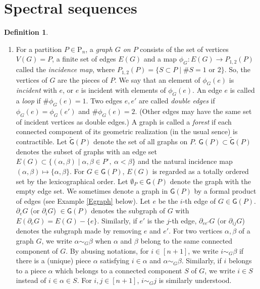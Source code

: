 \documentclass[reqno]{amsart}
\theoremstyle{definition}
\newtheorem{defi}{Definition}[section]
\theoremstyle{plain}
\newcommand{\GG}{\mathsf{G}}%
\newcommand{\TGG}{\tilde{\mathsf{G}}}%
\newcommand{\PP}{\mathrm{P}} %
\begin{document}
\section{Spectral sequences}\label{Sspec_seq}
\begin{defi}\label{Dgraph}
\begin{enumerate}
\item  For a partition $P\in \PP_n$, a {\em graph $G$ on   $P$} consists of the set of vertices $V(G)=P$, a finite set of edges $E(G)$ and a map $\phi_G:E(G)\to P_{1,2}(P)$ called the {\em incidence map}, where $P_{1,2}(P)=\{S\subset P\mid \# S=1 \text{ or } 2\}$. So, the vertices of $G$ are the pieces of $P$. We say that an element of $\phi_G(e)$ is {\em incident} with  $e$, or $e$ is incident with elements of $\phi_G(e)$.  An edge $e$ is called a {\em loop} if $\#\phi_G(e)=1$. Two edges $e,e'$ are called {\em double edges} if $\phi_G(e)=\phi_G(e')$ and $\#\phi_G(e)=2$. (Other edges may have the same set of incident  vertices  as double edges.) A graph is called a {\em forest} if each connected component of its geometric realization (in the usual sence) is contractible. Let $\TGG(P)$ denote the set of all graphs on  $P$.  
$\GG(P)\subset \TGG(P)$ denotes the subset of graphs with an edge set $E(G)\subset \{(\alpha,\beta)\mid \alpha, \beta \in P^\circ,\ \alpha<\beta\}$ and the natural incidence map $(\alpha,\beta)\mapsto \{\alpha,\beta\}$. For $G\in \GG(P)$, $E(G)$  is regarded as a totally ordered set by the lexicographical order. Let $\emptyset_P\in \GG(P)$ denote the graph with  the empty edge set. We  sometimes denote a graph in $\GG(P)$ by a formal product of edges (see Example \ref{Egraph} below).   Let $e$ be the $i$-th edge of $G\in \GG(P)$. $\partial_eG$ (or $\partial_iG$) $\in \GG(P)$ denotes the subgraph of $G$ with $E(\partial_eG)=E(G)-\{e\}$. Similarly, if $e'$ is the $j$-th edge, $\partial_{ee'}G$ (or $\partial_{ij}G$) denotes the subgraph made by removing $e$ and $e'$. For two vertices $\alpha, \beta$ of a graph $G$, we write $\alpha\sim_G\beta$ when $\alpha$ and $\beta$ belong to the same connected component of $G$. By abusing notations, for $i\in [n+1]$, we write $i\sim_G\beta$ if there is a (unique) piece $\alpha$ satisfying $i\in \alpha$ and $\alpha\sim_G\beta$. Similarly, if $i$ belongs to a piece $\alpha$ which belongs to a connected component $S$ of $G$, we write $i\in S$ instead of $i\in \alpha\in S$. For $i,j \in [n+1]$, $i\sim_Gj$ is similarly understood. 



\end{enumerate}
\end{defi}
\end{document}
